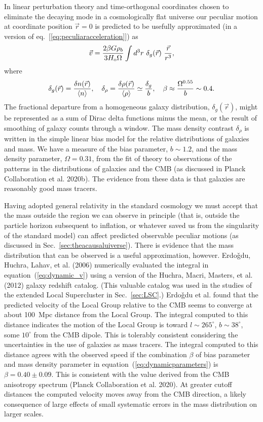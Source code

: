 \documentclass[fleqn,12pt]{article}
\begin{document}
In linear perturbation theory and time-orthogonal coordinates chosen to eliminate the decaying mode in a cosmologically flat universe our peculiar motion at coordinate position $\vec r=0$ is predicted to be usefully approximated (in a version of eq.~[\ref{eq:peculiaracceleration}]) as 
\begin{equation}
\vec v = {2\beta G \rho_b\over 3 H_{\rm o}\Omega}\int d^3r~\delta_g(\vec r)~{\vec r\over r^3},\label{eq:dynamic_v}
\end{equation}
where
\begin{equation}
\delta_g(\vec r) = {\delta n(\vec r)\over\langle n\rangle},\quad
\delta_\rho={\delta\rho(\vec r)\over\langle\rho\rangle}\simeq{\delta_g\over b},\quad  \beta \approx {\Omega^{0.55}\over b}\sim 0.4.\label{eq:dynamicparameters}
\end{equation}
The fractional departure from a homogeneous galaxy distribution, $\delta_g(\vec r)$, might be represented as a sum of Dirac delta functions minus the mean, or the result of smoothing of galaxy counts through a window. The  mass density contrast $\delta_\rho$ is written in the simple linear bias model for the relative distributions of galaxies and mass. We have a measure of the bias parameter, $b\sim 1.2$, and the mass density parameter, $\Omega=0.31$, from the fit of theory to observations of the patterns in the distributions of galaxies and the CMB (as discussed in Planck Collaboration et al. 2020b). The evidence from these data is that galaxies are reasonably good mass tracers. 

Having adopted general relativity in the standard cosmology we must accept that the mass outside the region we can observe in principle (that is, outside the particle horizon subsequent to inflation, or whatever saved us from the singularity of the standard model) can affect predicted observable peculiar motions (as discussed in Sec.~\ref{sec:theacausaluiverse}). There is evidence that the mass distribution that can be observed is a useful approximation, however. Erdo{\v{g}}du, Huchra, Lahav, et al. (2006) numerically evaluated the integral in equation~(\ref{eq:dynamic_v}) using a version of the Huchra, Macri, Masters, et al. (2012) galaxy redshift catalog. (This valuable catalog was used in the studies of the extended Local Supercluster in Sec.~\ref{sec:LSC}.) Erdo{\v{g}}du et al. found that the predicted velocity of the Local Group relative to the CMB seems to converge at about 100~Mpc distance from the Local Group. The integral computed to this distance indicates the motion of the Local Group is toward $l\sim 265^\circ$, $b\sim 38^\circ$, some $10^\circ$ from the CMB dipole. This is tolerably consistent considering the uncertainties in the use of galaxies as mass tracers. The integral computed to this distance agrees with the observed speed if the combination $\beta$ of bias parameter and mass density parameter in equation~(\ref{eq:dynamicparameters}) is $\beta = 0.40\pm 0.09$. This is consistent with the value derived from the CMB anisotropy spectrum (Planck Collaboration et al. 2020). At greater cutoff distances the computed velocity moves away from the CMB direction, a likely consequence of large effects of small systematic errors in the mass distribution on larger scales.
\end{document}
